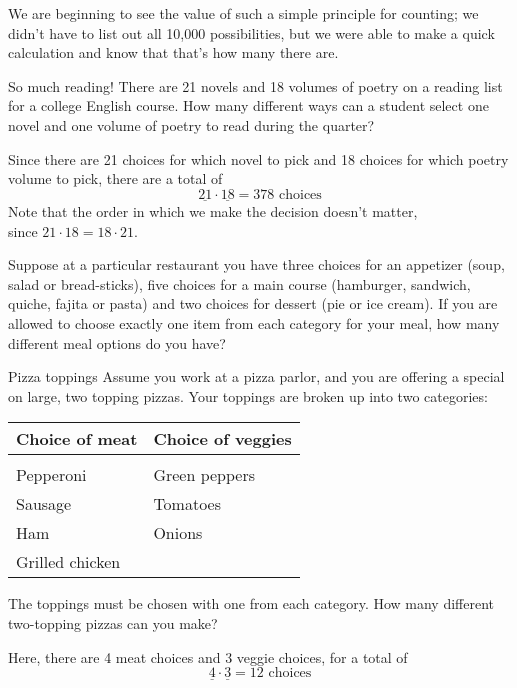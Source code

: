 We are beginning to see the value of such a simple principle for counting; we didn't have to list out all 10,000 possibilities, but we were able to make a quick calculation and know that that's how many there are.

\begin{example}[https://www.youtube.com/watch?v=MhWsP81KJ84&list=PLfmpjsIzhzts14-9s5QixRje97EI2oeMF&index=26]{So much reading!}
There are 21 novels and 18 volumes of poetry on a reading list for a college English course. How many different ways can a student select one novel and one volume of poetry to read during the quarter?

\sol
Since there are 21 choices for which novel to pick and 18 choices for which poetry volume to pick, there are a total of \[\underline{21} \cdot \underline{18} = \boxed{378 \textrm{ choices}}\]
Note that the order in which we make the decision doesn't matter,\\ since $21 \cdot 18 = 18 \cdot 21$.
\end{example}

\begin{try}
Suppose at a particular restaurant you have three choices for an appetizer (soup, salad or bread-sticks), five choices for a main course (hamburger, sandwich, quiche, fajita or pasta) and two choices for dessert (pie or ice cream). If you are allowed to choose exactly one item from each category for your meal, how many different meal options do you have?
\end{try}
\vspace{-0.25in}

\begin{example}[https://www.youtube.com/watch?v=R-yVVNKC0QQ&list=PLfmpjsIzhzts14-9s5QixRje97EI2oeMF&index=27]{Pizza toppings}
Assume you work at a pizza parlor, and you are offering a special on large, two topping pizzas. Your toppings are broken up into two categories:
\begin{center}
\begin{tabular}{l l}
\textbf{Choice of meat} & \textbf{Choice of veggies} \\ \hline
& \\
Pepperoni & Green peppers \\
Sausage & Tomatoes \\
Ham & Onions \\
Grilled chicken & \\ 
\end{tabular} 
\end{center}
The toppings must be chosen with one from each category. How many different two-topping
pizzas can you make?

\sol
Here, there are 4 meat choices and 3 veggie choices, for a total of 
\[\underline{4} \cdot \underline{3} = \boxed{12 \textrm{ choices}}\]
\end{example}

